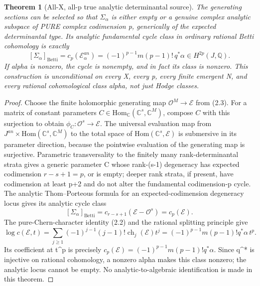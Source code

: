 \documentclass[11pt]{article}
\newtheorem{theorem}{Theorem}[section]
\begin{document}
\begin{theorem}[All-X, all-p true analytic determinantal source]
The generating sections can be selected so
that $\Sigma_\alpha$ is either empty
or a genuine complex analytic subspace
of PURE complex codimension p, generically
of the expected determinantal type. Its
analytic fundamental cycle class in ordinary
rational Betti cohomology is exactly
\[
 \boxed{
 [\Sigma_\alpha]_{\mathrm{Betti}}
   =c_p(\mathcal E_\alpha^{an})
   =(-1)^{p-1}m(p-1)!\,q^*\alpha
        \in H^{2p}(J,\mathbb Q).
 }                                                       \tag{3.2}
\]
If alpha is nonzero, the cycle is nonempty,
and in fact its class is nonzero. This
construction is unconditional on every X,
every p, every finite emergent N, and every
rational cohomological class alpha, not just
Hodge classes.
\end{theorem}
\begin{proof}
Choose the finite holomorphic generating
map $\mathcal O^M\to\mathcal E$ from (2.3).
For a matrix of constant parameters
$C\in\mathrm{Hom}_{\mathbb C}(\mathbb C^s,\mathbb C^M)$,
compose $C$ with this surjection to obtain
$\phi_C:\mathcal O^s\to\mathcal E$.
The universal evaluation map from
$J^{an}\times\mathrm{Hom}(\mathbb C^s,\mathbb C^M)$
to the total space of $\mathrm{Hom}(\mathbb C^s,\mathcal E)$
is submersive in its parameter direction,
because the pointwise evaluation of the
generating map is surjective. Parametric
transversality to the finitely many
rank-determinantal strata gives a
generic parameter C whose rank-(s-1)
degeneracy has expected codimension
$r-s+1=p$, or is empty; deeper
rank strata, if present, have codimension
at least p+2 and do not alter the
fundamental codimension-p cycle.
The analytic Thom--Porteous formula
for an expected-codimension degeneracy locus
gives its analytic cycle class
\[
 [\Sigma_\alpha]_{\mathrm{Betti}}
    =c_{r-s+1}(\mathcal E-\mathcal O^s)
    =c_p(\mathcal E).
\]
The pure-Chern-character identity (2.2)
and the rational splitting principle
give
\[
 \log c(\mathcal E,t)
  =\sum_{j\ge1}(-1)^{j-1}(j-1)!
         \operatorname{ch}_j(\mathcal E)t^j
  =(-1)^{p-1}m(p-1)!q^*\alpha\,t^p .
\]
Its coefficient at t^p is precisely
$c_p(\mathcal E)=(-1)^{p-1}m(p-1)!q^*\alpha$.
Since q^* is injective on rational
cohomology, a nonzero alpha makes this
class nonzero; the analytic locus cannot
be empty. No analytic-to-algebraic
identification is made in this theorem.
\end{proof}
\end{document}
